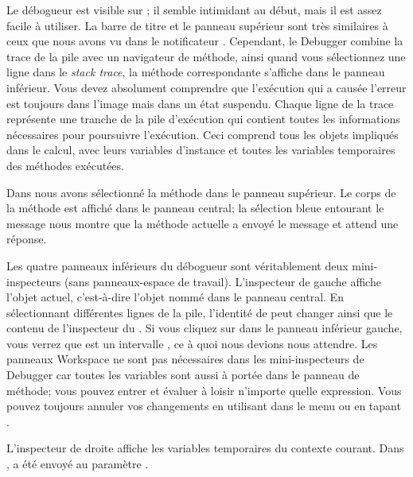 \documentclass[a4paper,10pt,twoside]{book}
\begin{document}
Le débogueur est visible sur ; 
il semble intimidant au début, mais il est assez facile à utiliser.
La barre de titre et le panneau supérieur sont très similaires
à ceux que nous avons vu dans le notificateur .
Cependant, le Debugger combine la trace de la pile avec un navigateur de
méthode, ainsi quand vous sélectionnez une ligne dans le \emph{stack
trace}, la méthode correspondante s'affiche dans le panneau inférieur.
Vous devez absolument comprendre que l'exécution qui a causée l'erreur
est toujours dans l'image mais dans un état suspendu.
Chaque ligne de la trace représente une tranche de la pile
d'exécution qui contient toutes les informations nécessaires
pour poursuivre l'exécution. Ceci comprend tous les objets impliqués
dans le calcul, avec leurs variables d'instance et toutes les variables
temporaires des méthodes exécutées.

Dans  nous avons sélectionné
la méthode  dans le panneau supérieur.
Le corps de la méthode est affiché dans le panneau central;
la sélection bleue entourant le message  nous montre
que la méthode actuelle a envoyé le message  et
attend une réponse.

Les quatre panneaux inférieurs du débogueur sont véritablement deux
mini-inspecteurs (sans panneaux-espace de travail).
L'inspecteur de gauche affiche l'objet actuel,
c'est-à-dire l'objet nommé \self dans le panneau central.
En sélectionnant différentes lignes de la pile, l'identité de \self
peut changer ainsi que le contenu de
l'inspecteur du \self{}.
Si vous cliquez sur \self dans le panneau inférieur gauche, vous verrez
que \self est un intervalle , ce à quoi nous devions
nous attendre.
Les panneaux Workspace ne sont pas nécessaires dans les mini-inspecteurs
de Debugger car toutes les variables sont aussi à portée dans
le panneau de méthode; vous pouvez entrer et évaluer à loisir 
n'importe quelle expression.
Vous pouvez toujours annuler vos changements en utilisant 
 dans le menu ou en tapant . 

L'inspecteur de droite affiche les variables temporaires du contexte courant.
Dans ,
 a été envoyé au paramètre .

\end{document}
